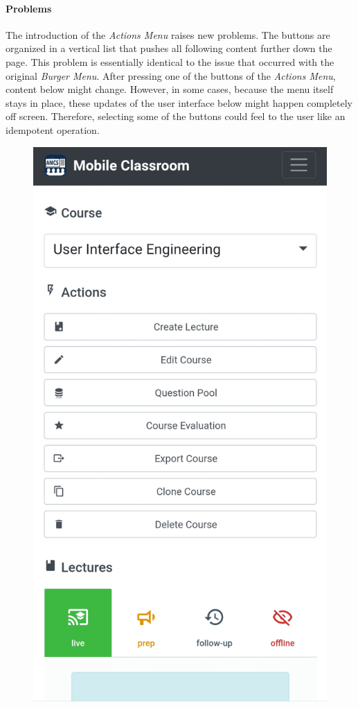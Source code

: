 \paragraph{Problems}
The introduction of the \emph{Actions Menu} raises new problems. The buttons are organized in a vertical list that pushes all following content further down the page. This problem is essentially identical to the issue that occurred with the original \emph{Burger Menu}. After pressing one of the buttons of the \emph{Actions Menu}, content below might change. However, in some cases, because the menu itself stays in place, these updates of the user interface below might happen completely off screen. Therefore, selecting some of the buttons could feel to the user like an idempotent operation.
\begin{figure}
	\vspace*{-1cm}
	\centering
	\begin{minipage}[t]{.5\textwidth}
		\centering
		\includegraphics[width=0.95\linewidth]{screenshots/redesign/problem_main_view_course_actions.jpg}

\end{minipage}
\end{figure}
